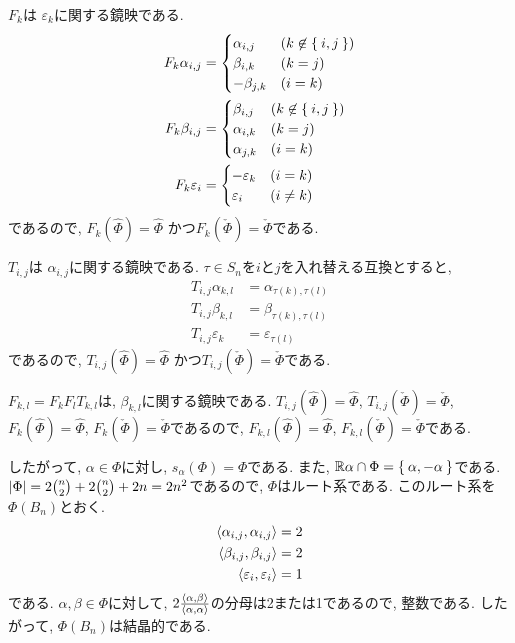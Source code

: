 $F_{k}$は
$\varepsilon_{k}$に関する鏡映である.
\begin{align*}
  F_{k}\alpha_{i,j}&=
  \begin{cases}
    \alpha_{i,j} & (k\not\in \Set{i,j})\\
    \beta_{i,k} & (k=j)\\
    -\beta_{j,k} & (i=k)\\
  \end{cases}
  \\
  F_k \beta_{i,j}&=
  \begin{cases}
    \beta_{i,j} & (k\not\in \Set{i,j})\\
    \alpha_{i,k} & (k=j)\\
    \alpha_{j,k} & (i=k)
  \end{cases}
  \\
  F_{k}\varepsilon_{i}&=
  \begin{cases}
    -\varepsilon_{k}&(i=k)\\
    \varepsilon_{i} &(i\neq k)
  \end{cases}
\end{align*}
であるので, 
$F_{k}(\hat\Phi)=\hat\Phi$
かつ$F_{k}(\check\Phi)=\check\Phi$である.

$T_{i,j}$は
$\alpha_{i,j}$に関する鏡映である.
$\tau\in S_n$を$i$と$j$を入れ替える互換とすると,
\begin{align*}
  T_{i,j}\alpha_{k,l}&=\alpha_{\tau(k),\tau(l)}\\
  T_{i,j}\beta_{k,l}&=\beta_{\tau(k),\tau(l)}\\
  T_{i,j}\varepsilon_{k}&=\varepsilon_{\tau(l)}
\end{align*}
であるので,
$T_{i,j}(\hat\Phi)=\hat\Phi$
かつ$T_{i,j}(\check\Phi)=\check\Phi$である.


$F_{k,l}=F_kF_lT_{k,l}$は, $\beta_{k,l}$に関する鏡映である.
$T_{i,j}(\hat\Phi)=\hat\Phi$,
$T_{i,j}(\check\Phi)=\check\Phi$,
$F_{k}(\hat\Phi)=\hat\Phi$,
$F_{k}(\check\Phi)=\check\Phi$であるので,
$F_{k,l}(\hat\Phi)=\hat\Phi$,
$F_{k,l}(\check\Phi)=\check\Phi$である.

したがって, $\alpha\in \Phi$に対し,
$s_{\alpha}(\Phi)=\Phi$である.
また,
$\mathbb{R}\alpha\cap\Phi=\Set{\alpha,-\alpha}$である.
$\left|\Phi\right|=2\binom{n}{2}+2\binom{n}{2}+2n=2n^2$であるので,
$\Phi$はルート系である.
このルート系を$\Phi(B_{n})$とおく.
\begin{align*}
  \Braket{\alpha_{i,j},\alpha_{i,j}}&=2\\
  \Braket{\beta_{i,j},\beta_{i,j}}&=2\\
  \Braket{\varepsilon_{i},\varepsilon_{i}}&=1
\end{align*}
である.
$\alpha,\beta\in\Phi$に対して,
$2\frac{\Braket{\alpha,\beta}}{\Braket{\alpha,\alpha}}$の分母は2または1であるので, 整数である.
したがって,
$\Phi(B_{n})$は結晶的である.

